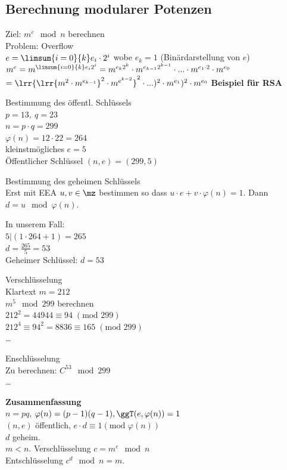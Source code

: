 	\subsection{Berechnung modularer Potenzen}
		Ziel: $m^e\mod n$ berechnen\\
		Problem: Overflow\\
		$e=\limsum{i=0}{k}e_i\cdot 2^i$ wobe $e_k=1$ (Binärdarstellung von $e$)\\
		$m^e=m^{\limsum{i=0}{k}e_i2^i}=m^{e_k2^k}\cdot m^{e_{k-1}2^{k-1}}\cdot ... \cdot m^{e_1\cdot 2}\cdot m^{e_0}$\\
		$=\lrr{\lrr{m^2\cdot m^{e_{k-1}}}^2\cdot m^{e^{k-2}}}^2\cdot ...)^2\cdot m^{e_1})^2\cdot m^{e_0}$
\newpage
		\textbf{Beispiel für RSA}
			\item Bestimmung des öffentl. Schlüssels\\			
				$p=13,\ q=23$\\
				$n=p\cdot q=299$\\
				$\varphi(n)=12\cdot 22=264$\\
				kleinstmögliches $e=5$\\
				Öffentlicher Schlüssel $(n,e)=(299,5)$
			\item Bestimmung des geheimen Schlüssels\\
				Erst mit EEA $u,v\in\mz$
bestimmen so dass $u\cdot e+v\cdot\varphi(n)=1$. Dann $d=u\mod\varphi(n)$.

				In unserem Fall:\\
				$5|(1\cdot 264+1)=265$\\
				$d=\frac{265}{5}=53$\\
				Geheimer Schlüssel: $d=53$
			\item Verschlüsselung\\
				Klartext $m=212$\\
				$m^5\mod 299$ berechnen\\
				$212^2=44944\equiv 94\;(\mbox{mod } 299)$\\
				$212^4\equiv 94^2=8836\equiv 165\;(\mbox{mod } 299)$\\
				\dots
			\item Enschlüsselung\\
				Zu berechnen: $C^{53}\mod 299$\\
				\dots
		\subExEnd
		
		\textbf{Zusammenfassung}\\
		$n=pq$, $\varphi(n)=(p-1)(q-1), \ggT(e,\varphi(n))=1$\\
		$(n,e)$ öffentlich, $e\cdot d\equiv 1(\mbox{mod }\varphi(n))$\\
		$d$ geheim.\\
		$m<n$. Verschlüsselung $c=m^e\mod n$\\
		Entschlüsselung $c^d\mod n=m$.
\newpage		

